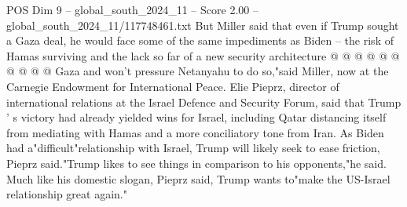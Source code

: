 \begin{textsample}{POS Dim 9 – global\_south\_2024\_11 – Score 2.00 – global\_south\_2024\_11/117748461.txt}
But Miller said that even if Trump sought a Gaza deal, he would face some of the same impediments as Biden -- the risk of Hamas surviving and the lack so far of a new security architecture @ @ @ @ @ @ @ @ @ @ Gaza and won't pressure Netanyahu to do so,"said Miller, now at the Carnegie Endowment for International Peace.
Elie Pieprz, director of international relations at the Israel Defence and Security Forum, said that Trump ' s victory had already yielded wins for Israel, including Qatar distancing itself from mediating with Hamas and a more conciliatory tone from Iran.
As Biden had a"difficult"relationship with Israel, Trump will likely seek to ease friction, Pieprz said."Trump likes to see things in comparison to his opponents,"he said.
Much like his domestic slogan, Pieprz said, Trump wants to"make the US-Israel relationship great again."

\end{textsample}
